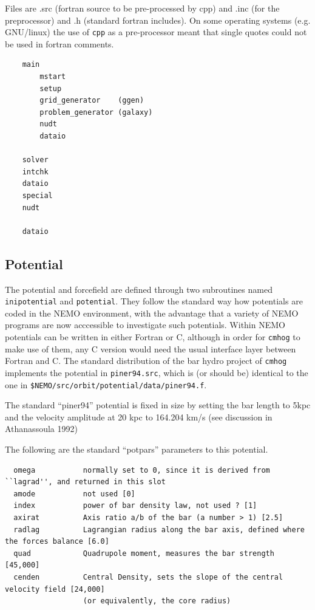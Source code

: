 \documentclass[10pt,dvips]{article}
\begin{document}
Files are .src (fortran source to be pre-processed by cpp) and 
.inc (for the preprocessor) and .h (standard fortran includes).
On some operating systems (e.g. GNU/linux) the use of
{\tt cpp} as a pre-processor meant that single quotes could 
not be used in fortran comments.

\begin{verbatim}
    main    
        mstart
	    setup
	    grid_generator    (ggen)
	    problem_generator (galaxy)
	    nudt
        dataio
	
	solver
	intchk
	dataio
	special
	nudt
	
	dataio
\end{verbatim}

\subsection{Potential}

The potential and forcefield are defined through two subroutines
named {\tt inipotential} and {\tt potential}. They follow the
standard way how potentials are coded in the NEMO environment,
with the advantage that a variety of NEMO programs are now 
acccessible to investigate such potentials. Within NEMO potentials
can be written in either Fortran or C, although in order for
{\tt cmhog} to make use of them, any C version would need the
usual interface layer between Fortran and C. The standard distribution
of the bar hydro project of {\tt cmhog} implements the potential
in {\tt piner94.src}, which is (or should be) identical to the
one in {\tt \$NEMO/src/orbit/potential/data/piner94.f}.

The standard ``piner94'' potential is fixed in size by
setting the bar length to 5kpc and the velocity amplitude
at 20 kpc to 164.204 km/s (see discussion in Athanassoula 1992)

The following are the standard ``potpars'' parameters to this potential.

\begin{verbatim}
  omega           normally set to 0, since it is derived from ``lagrad'', and returned in this slot
  amode           not used [0]
  index           power of bar density law, not used ? [1]
  axirat          Axis ratio a/b of the bar (a number > 1) [2.5]
  radlag          Lagrangian radius along the bar axis, defined where the forces balance [6.0]
  quad            Quadrupole moment, measures the bar strength [45,000]
  cenden          Central Density, sets the slope of the central velocity field [24,000]
                  (or equivalently, the core radius)
  
\end{verbatim}
\end{document}
